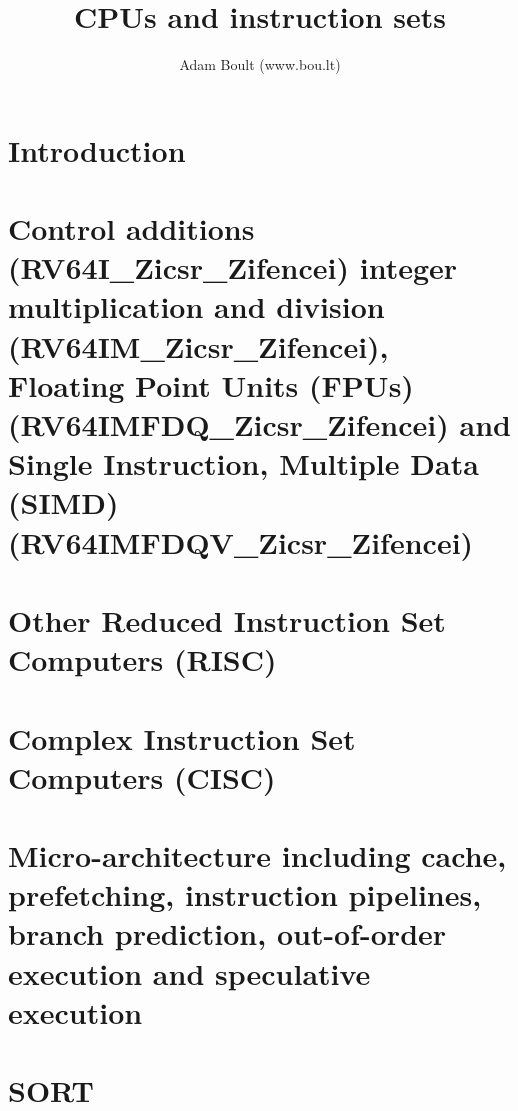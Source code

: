\documentclass[oneside]{book}
\begin{document}
\author{Adam Boult (www.bou.lt)}
\title{CPUs and instruction sets}
\maketitle

\setcounter{tocdepth}{0}
\tableofcontents



\part{Introduction}

\part{Control additions (RV64I\_Zicsr\_Zifencei) integer multiplication and division (RV64IM\_Zicsr\_Zifencei), Floating Point Units (FPUs) (RV64IMFDQ\_Zicsr\_Zifencei) and Single Instruction, Multiple Data (SIMD) (RV64IMFDQV\_Zicsr\_Zifencei)}

\part{Other Reduced Instruction Set Computers (RISC)}








\part{Complex Instruction Set Computers (CISC)}







\part{Micro-architecture including cache, prefetching, instruction pipelines, branch prediction, out-of-order execution and speculative execution}

\part{SORT}

\end{document}
